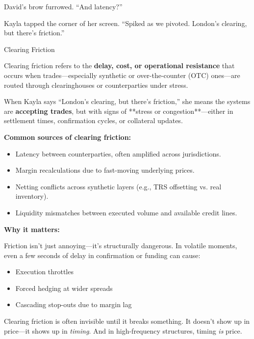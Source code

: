 David’s brow furrowed. “And latency?”

Kayla tapped the corner of her screen. “Spiked as we pivoted. London’s clearing, but there’s friction.”

\medskip

\begin{TechnicalSidebar}{Clearing Friction}

  Clearing friction refers to the \textbf{delay, cost, or operational resistance} that occurs when trades—especially 
  synthetic or over-the-counter (OTC) ones—are routed through clearinghouses or counterparties under stress.
 
  \medskip
  
  When Kayla says “London’s clearing, but there’s friction,” she means the systems are \textbf{accepting trades}, 
  but with signs of **stress or congestion**—either in settlement times, confirmation cycles, or collateral updates.

  \medskip
  
  \textbf{Common sources of clearing friction:}

  \medskip

  \begin{itemize}
    \item Latency between counterparties, often amplified across jurisdictions.
    \item Margin recalculations due to fast-moving underlying prices.
    \item Netting conflicts across synthetic layers (e.g., TRS offsetting vs. real inventory).
    \item Liquidity mismatches between executed volume and available credit lines.
  \end{itemize}
  
  \medskip
  
  \textbf{Why it matters:}  

  \medskip

  Friction isn’t just annoying—it’s structurally dangerous. In volatile moments, even a few seconds of delay in 
  confirmation or funding can cause:

  \medskip

  \begin{itemize}
    \item Execution throttles
    \item Forced hedging at wider spreads
    \item Cascading stop-outs due to margin lag
  \end{itemize}

  \medskip
  
  Clearing friction is often invisible until it breaks something. It doesn’t show up in price—it shows up in 
  \textit{timing}.  
  And in high-frequency structures, timing \textit{is} price.
  
\end{TechnicalSidebar}

